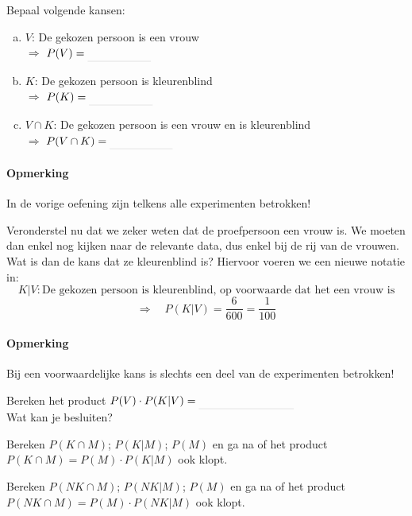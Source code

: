 \documentclass[12pt,twoside]{article}
\begin{document}
\begin{oefening}
Bepaal volgende kansen:
\begin{enumerate}[(a)]
  \item $V$: De gekozen persoon is een vrouw\\$\Rightarrow$ $P(V)=\arule{2cm}$
  \item $K$: De gekozen persoon is kleurenblind\\$\Rightarrow$ $P(K)=\arule{2cm}$
  \item $V\cap K$: De gekozen persoon is een vrouw en is kleurenblind\\$\Rightarrow$ $P(V\cap K)=\arule{2cm}$
\end{enumerate}
\end{oefening}

\paragraph*{Opmerking} In de vorige oefening zijn telkens alle experimenten betrokken!


Veronderstel nu dat we zeker weten dat de proefpersoon een vrouw is. We moeten dan enkel nog kijken naar de relevante data, dus enkel bij de rij van de vrouwen. Wat is dan de kans dat ze kleurenblind is? Hiervoor voeren we een nieuwe notatie in:
$$K|V:\mbox{De gekozen persoon is kleurenblind, op voorwaarde dat het een vrouw is}$$
$$\Rightarrow\quad P(K|V)=\dfrac{6}{600}=\dfrac{1}{100}$$

\paragraph*{Opmerking} Bij een voorwaardelijke kans is slechts een deel van de experimenten betrokken!

\begin{oefening}
Bereken het product $P(V)\cdot P(K|V)=\arule{3cm}$\\
Wat kan je besluiten?
\end{oefening}

\begin{oefening}
Bereken $P(K\cap M)$; $P(K|M)$; $P(M)$ en ga na of het product $P(K\cap M)=P(M)\cdot P(K|M)$ ook klopt.
\end{oefening}

\begin{oefening}
Bereken $P(NK\cap M)$; $P(NK|M)$; $P(M)$ en ga na of het product $P(NK\cap M)=P(M)\cdot P(NK|M)$ ook klopt.
\end{oefening}
\end{document}
